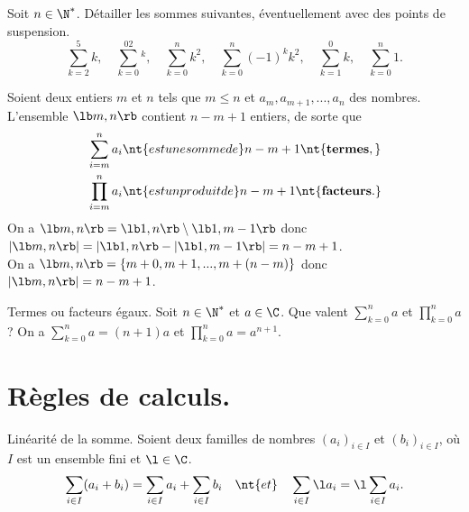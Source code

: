 \documentclass[11pt]{article}
\begin{document}
\setcounter{tcb@cnt@thm}{1}

\begin{ex}{}{}
    Soit $n\in\N^*$. Détailler les sommes suivantes, éventuellement avec des points de suspension.
    \begin{equation*}
        \sum_{k=2}^{5}k,\quad\sum_{k=0}^02^k,\quad\sum_{k=0}^nk^2,\quad\sum_{k=0}^n(-1)^kk^2,\quad\sum_{k=1}^0k,\quad\sum_{k=0}^n1.
    \end{equation*}
\end{ex}

\pagebreak

\begin{prop}{}{}
    Soient deux entiers $m$ et $n$ tels que $m\leq n$ et $a_m,a_{m+1},...,a_n$ des nombres.\\
    L'ensemble $\lb m,n\rb$ contient $n-m+1$ entiers, de sorte que
    \begin{equation*}
        \begin{aligned}
            &\sum_{i=m}^na_i \nt{ est une somme de } n-m+1 \nt{ \bf{termes},}\\
            &\prod_{i=m}^na_i \nt{ est un produit de } n-m+1 \nt{ \bf{facteurs}.}
        \end{aligned}
    \end{equation*}
    \tcblower
    On a $\lb m,n \rb = \lb 1, n \rb \setminus \lb 1, m-1\rb$ donc $|\lb m,n\rb|=|\lb1,n\rb - |\lb1,m-1\rb|=n-m+1$.\\
    On a $\lb m,n\rb = \{m+0, m+1, ..., m + (n-m)\}$ donc $|\lb m,n \rb|=n-m+1$.
\end{prop}

\begin{ex}{Termes ou facteurs égaux.}{}
    Soit $n\in\N^*$ et $a\in\C$. Que valent $\sum\limits_{k=0}^na$ et $\prod\limits_{k=0}^na$ ?
    \tcblower
    On a $\sum\limits_{k=0}^na=(n+1)a$ et $\prod\limits_{k=0}^na=a^{n+1}$.
\end{ex}

\section{Règles de calculs.}

\begin{prop}{Linéarité de la somme.}{}
    Soient deux familles de nombres $(a_i)_{i\in I}$ et $(b_i)_{i\in I}$, où $I$ est un ensemble fini et $\l\in\C$.
    \begin{equation*}
        \sum_{i\in I}(a_i+b_i)=\sum_{i\in I}a_i+\sum_{i\in I}b_i\quad\nt{et}\quad\sum_{i\in I}\l a_i=\l\sum_{i\in I}a_i.
    \end{equation*}
\end{prop}
\end{document}
